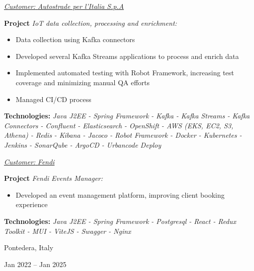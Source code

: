 \documentclass[10pt, a4paper]{article}
\newenvironment{highlights}{
    \begin{itemize}[
        topsep=0.10 cm,
        parsep=0.10 cm,
        partopsep=0pt,
        itemsep=0pt,
        leftmargin=0.4 cm + 10pt
    ]
}{
    \end{itemize}
} %
\newenvironment{twocolentry}[2][]{
    \onecolentry
    \def\secondColumn{#2}
    \setcolumnwidth{\fill, 4.5 cm}
    \begin{paracol}{2}
}{
    \switchcolumn \raggedleft \secondColumn
    \end{paracol}
    \endonecolentry
} %
\begin{document}
\begin{twocolentry}{
            \fontsize{14}{18}Pontedera, Italy

        Jan 2022 – Jan 2025
            \normalsize
        }
                \vspace{0.10 cm}

                \vspace{0.10 cm}

                \textcolor{tertiaryColor}{\faAngleDoubleRight\hspace{0.1cm}\underline{\textit{Customer:} \textit{Autostrade per l'Italia S.p.A}}}

                \vspace{0.2cm}
                \textbf{Project \faAngleRight} \textit{IoT data collection, processing and enrichment:}

                \begin{highlights}
                        \item Data collection using Kafka connectors
                        \item Developed several Kafka Streams applications to process and enrich data
                        \item Implemented automated testing with Robot Framework, increasing test coverage and minimizing manual QA efforts
                        \item Managed CI/CD process
                \end{highlights}
                \faBuffer
                \textbf{ Technologies:} \textit{Java J2EE - Spring Framework - Kafka - Kafka Streams - Kafka Connectors - Confluent - Elasticsearch - OpenShift - AWS (EKS, EC2, S3, Athena) - Redis - Kibana - Jacoco - Robot Framework - Docker - Kubernetes - Jenkins - SonarQube - ArgoCD - Urbancode Deploy}

                \vspace{0.10 cm}

                \vspace{0.10 cm}

                \textcolor{tertiaryColor}{\faAngleDoubleRight\hspace{0.1cm}\underline{\textit{Customer:} \textit{Fendi}}}

                \vspace{0.2cm}
                \textbf{Project \faAngleRight} \textit{Fendi Events Manager:}

                \begin{highlights}
                        \item Developed an event management platform, improving client booking experience
                \end{highlights}
                \faBuffer
                \textbf{ Technologies:} \textit{Java J2EE - Spring Framework - Postgresql - React - Redux Toolkit - MUI - ViteJS - Swagger - Nginx}


\end{twocolentry}
\end{document}
